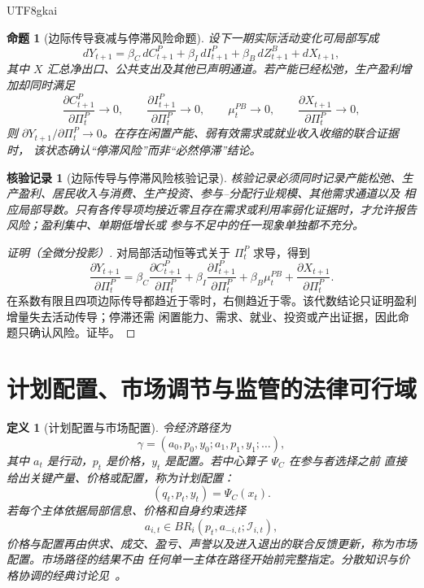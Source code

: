 \documentclass[12pt,a4paper,openany]{report}
\newtheorem{definition}{定义}[chapter]
\newtheorem{proposition}{命题}[chapter]
\newtheorem{Certificate}{核验记录}[chapter]
\newcommand{\Info}{\mathcal I}
\begin{document}
\begin{CJK*}{UTF8}{gkai}
\begin{proposition}[边际传导衰减与停滞风险命题]
\label{prop:core-bridge-stagnation-risk}
设下一期实际活动变化可局部写成
\[
  dY_{t+1}
  =\beta_C\,dC_{t+1}^P
  +\beta_I\,dI_{t+1}^P
  +\beta_B\,dZ_{t+1}^B
  +dX_{t+1},
\]
其中 \(X\) 汇总净出口、公共支出及其他已声明通道。若产能已经松弛，生产盈利增加却同时满足
\[
  \frac{\partial C_{t+1}^P}{\partial\Pi_t^P}\to0,
  \qquad
  \frac{\partial I_{t+1}^P}{\partial\Pi_t^P}\to0,
  \qquad
  \mu_t^{PB}\to0,
  \qquad
  \frac{\partial X_{t+1}}{\partial\Pi_t^P}\to0,
\]
则 \(\partial Y_{t+1}/\partial\Pi_t^P\to0\)。在存在闲置产能、弱有效需求或就业收入收缩的联合证据时，
该状态确认“停滞风险”而非“必然停滞”结论。
\end{proposition}

\begin{Certificate}[边际传导与停滞风险核验记录]
核验记录必须同时记录产能松弛、生产盈利、居民收入与消费、生产投资、参与--分配行业规模、其他需求通道以及
相应局部导数。只有各传导项均接近零且存在需求或利用率弱化证据时，才允许报告风险；盈利集中、单期低增长或
参与不足中的任一现象单独都不充分。
\end{Certificate}

\begin{proof}[证明（全微分投影）]
对局部活动恒等式关于 \(\Pi_t^P\) 求导，得到
\[
  \frac{\partial Y_{t+1}}{\partial\Pi_t^P}
  =\beta_C\frac{\partial C_{t+1}^P}{\partial\Pi_t^P}
  +\beta_I\frac{\partial I_{t+1}^P}{\partial\Pi_t^P}
  +\beta_B\mu_t^{PB}
  +\frac{\partial X_{t+1}}{\partial\Pi_t^P}.
\]
在系数有限且四项边际传导都趋近于零时，右侧趋近于零。该代数结论只证明盈利增量失去活动传导；停滞还需
闲置能力、需求、就业、投资或产出证据，因此命题只确认风险。证毕。
\end{proof}

\section{计划配置、市场调节与监管的法律可行域}

\begin{definition}[计划配置与市场配置]
令经济路径为
\[
  \gamma=(a_0,p_0,y_0;a_1,p_1,y_1;\ldots),
\]
其中 \(a_t\) 是行动，\(p_t\) 是价格，\(y_t\) 是配置。若中心算子 \(\Psi_C\) 在参与者选择之前
直接给出关键产量、价格或配置，称为计划配置：
\[
  (q_t,p_t,y_t)=\Psi_C(x_t).
\]
若每个主体依据局部信息、价格和自身约束选择
\[
  a_{i,t}\in BR_i(p_t,a_{-i,t};\Info_{i,t}),
\]
价格与配置再由供求、成交、盈亏、声誉以及进入退出的联合反馈更新，称为市场配置。市场路径的结果不由
任何单一主体在路径开始前完整指定。分散知识与价格协调的经典讨论见~\cite{Hayek1945Knowledge}。
\end{definition}


\end{CJK*}
\end{document}
